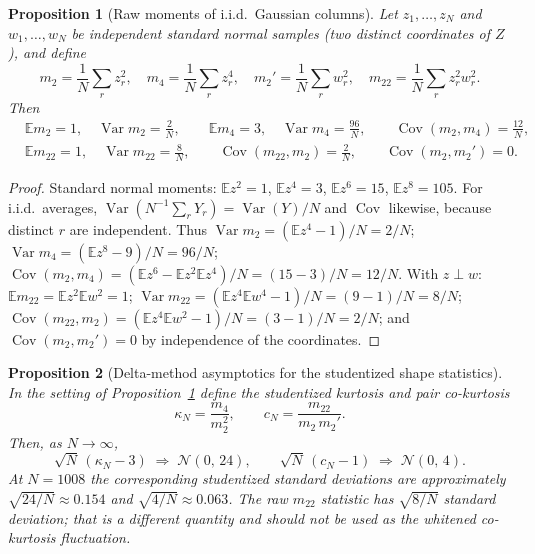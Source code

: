 \documentclass[11pt]{article}
\newtheorem{proposition}{Proposition}[section]
\theoremstyle{definition}
\theoremstyle{remark}
\begin{document}
\begin{proposition}[Raw moments of i.i.d.\ Gaussian columns]
\label{prop:gsv-iid-gaussian-moments}
Let $z_1,\dots,z_N$ and $w_1,\dots,w_N$ be independent standard normal
samples (two distinct coordinates of $Z$), and define
\begin{equation}
 m_2=\frac1N\sum_{r}z_r^{2},\quad
 m_4=\frac1N\sum_{r}z_r^{4},\quad
 m_2'=\frac1N\sum_{r}w_r^{2},\quad
 m_{22}=\frac1N\sum_{r}z_r^{2}w_r^{2}.
\end{equation}
Then
\begin{equation}
\label{eq:gsv-iid-moments}
\begin{aligned}
 &\mathbb{E}m_2=1,\quad \operatorname{Var}m_2=\tfrac{2}{N},\qquad
 \mathbb{E}m_4=3,\quad \operatorname{Var}m_4=\tfrac{96}{N},\qquad
 \operatorname{Cov}(m_2,m_4)=\tfrac{12}{N},\\
 &\mathbb{E}m_{22}=1,\quad \operatorname{Var}m_{22}=\tfrac{8}{N},\qquad
 \operatorname{Cov}(m_{22},m_2)=\tfrac{2}{N},\qquad
 \operatorname{Cov}(m_2,m_2')=0 .
\end{aligned}
\end{equation}
\end{proposition}

\begin{proof}
Standard normal moments: $\mathbb{E}z^{2}=1$, $\mathbb{E}z^{4}=3$,
$\mathbb{E}z^{6}=15$, $\mathbb{E}z^{8}=105$.  For i.i.d.\ averages,
$\operatorname{Var}(N^{-1}\sum_rY_r)=\operatorname{Var}(Y)/N$ and
$\operatorname{Cov}$ likewise, because distinct $r$ are independent.  Thus
$\operatorname{Var}m_2=(\mathbb{E}z^{4}-1)/N=2/N$;
$\operatorname{Var}m_4=(\mathbb{E}z^{8}-9)/N=96/N$;
$\operatorname{Cov}(m_2,m_4)=(\mathbb{E}z^{6}-\mathbb{E}z^{2}\mathbb{E}z^{4})/N
=(15-3)/N=12/N$.
With $z\perp w$:
$\mathbb{E}m_{22}=\mathbb{E}z^{2}\mathbb{E}w^{2}=1$;
$\operatorname{Var}m_{22}
=(\mathbb{E}z^{4}\mathbb{E}w^{4}-1)/N=(9-1)/N=8/N$;
$\operatorname{Cov}(m_{22},m_2)
=(\mathbb{E}z^{4}\mathbb{E}w^{2}-1)/N=(3-1)/N=2/N$;
and $\operatorname{Cov}(m_2,m_2')=0$ by independence of the coordinates.
\end{proof}

\begin{proposition}[Delta-method asymptotics for the studentized shape statistics]
\label{prop:gsv-delta-method}
In the setting of Proposition~\ref{prop:gsv-iid-gaussian-moments} define the
studentized kurtosis and pair co-kurtosis
\begin{equation}
 \kappa_N=\frac{m_4}{m_2^{2}},
 \qquad
 c_N=\frac{m_{22}}{m_2\,m_2'} .
\end{equation}
Then, as $N\to\infty$,
\begin{equation}
\label{eq:gsv-delta}
 \sqrt N\,(\kappa_N-3)\;\Rightarrow\;\mathcal N(0,\,24),
 \qquad
 \sqrt N\,(c_N-1)\;\Rightarrow\;\mathcal N(0,\,4).
\end{equation}
At $N=1008$ the corresponding studentized standard deviations are approximately
$\sqrt{24/N}\approx0.154$ and $\sqrt{4/N}\approx0.063$.  The raw
$m_{22}$ statistic has $\sqrt{8/N}$ standard deviation; that is a different
quantity and should not be used as the whitened co-kurtosis fluctuation.
\end{proposition}
\end{document}
